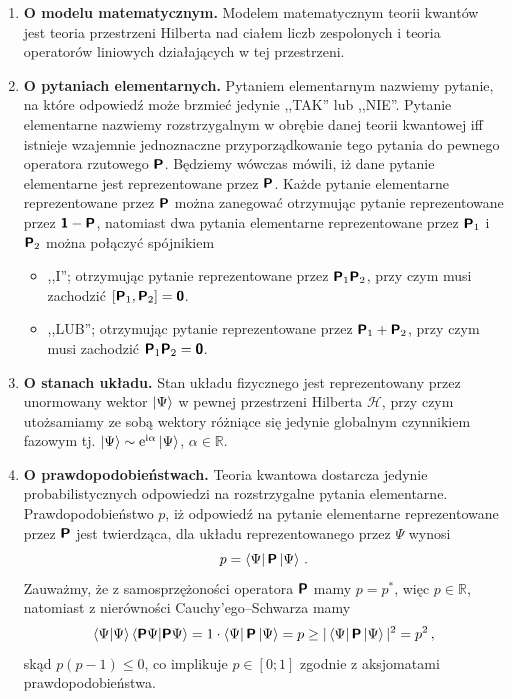 \documentclass{myclass}
\begin{document}
\begin{enumerate}[label=\Roman*.]
    
    \item \textbf{O modelu matematycznym.} Modelem matematycznym teorii kwantów jest teoria
    przestrzeni Hilberta nad ciałem liczb zespolonych i teoria operatorów liniowych działających w
    tej przestrzeni.

    \item \textbf{O pytaniach elementarnych.} Pytaniem elementarnym nazwiemy pytanie, na które
    odpowiedź może brzmieć jedynie ,,TAK'' lub ,,NIE''. Pytanie elementarne nazwiemy rozstrzygalnym
    w obrębie danej teorii kwantowej iff istnieje wzajemnie jednoznaczne przyporządkowanie tego
    pytania do pewnego operatora rzutowego \(\boldsymbol{\mathsf{P}}\). Będziemy wówczas mówili, iż dane pytanie
    elementarne jest reprezentowane przez \(\boldsymbol{\mathsf{P}}\). Każde pytanie elementarne reprezentowane
    przez \(\boldsymbol{\mathsf{P}}\) można zanegować otrzymując pytanie reprezentowane przez \(\boldsymbol{\mathsf{1}} -
    \boldsymbol{\mathsf{P}}\), natomiast dwa pytania elementarne reprezentowane przez \(\boldsymbol{\mathsf{P}}_1\) i
    \(\boldsymbol{\mathsf{P}}_2\) można połączyć spójnikiem
    \begin{itemize}
        \item ,,I''; otrzymując pytanie reprezentowane przez \(\boldsymbol{\mathsf{P}}_1\boldsymbol{\mathsf{P}}_2\), przy czym
        musi zachodzić \([\boldsymbol{\mathsf{P}}_1, \boldsymbol{\mathsf{P}}_2] = \boldsymbol{\mathsf{\mathsf{0}}}\).

        \item ,,LUB''; otrzymując pytanie reprezentowane przez \(\boldsymbol{\mathsf{P}}_1 + \boldsymbol{\mathsf{P}}_2\), przy
        czym musi zachodzić \(\boldsymbol{\mathsf{P}}_1\boldsymbol{\mathsf{P}}_2 = \boldsymbol{\mathsf{\mathsf{0}}}\).

    \end{itemize}

    \item \textbf{O stanach układu.} Stan układu fizycznego jest reprezentowany przez unormowany
    wektor \(\ket{\Psi}\) w pewnej przestrzeni Hilberta \(\mathscr{H}\), przy czym utożsamiamy ze
    sobą wektory różniące się jedynie globalnym czynnikiem fazowym tj. \(\ket{\Psi} \sim
    \mathrm{e}^{\mathrm{i}\alpha}\ket{\Psi}\), \(\alpha \in \mathbb{R}\).

    \item \textbf{O prawdopodobieństwach.} Teoria kwantowa dostarcza jedynie probabilistycznych
    odpowiedzi na rozstrzygalne pytania elementarne. Prawdopodobieństwo \(p\), iż odpowiedź na
    pytanie elementarne reprezentowane przez \(\boldsymbol{\mathsf{P}}\) jest twierdząca, dla układu
    reprezentowanego przez \(\Psi\) wynosi
    \begin{equation*}
        p = \bra{\Psi}\boldsymbol{\mathsf{P}}\ket{\Psi}\,.
    \end{equation*}
    Zauważmy, że z samosprzężoności operatora \(\boldsymbol{\mathsf{P}}\) mamy \(p = p^*\), więc \(p
    \in\mathbb{R}\), natomiast z nierówności Cauchy'ego--Schwarza mamy
    \begin{equation*}
        \braket{\Psi}\braket{\boldsymbol{\mathsf{P}}\Psi} = 1 \cdot \bra{\Psi}\boldsymbol{\mathsf{P}}\ket{\Psi} = p \geq |\bra{\Psi}\boldsymbol{\mathsf{P}}\ket{\Psi}|^2 = p^2\,,
    \end{equation*}
    skąd \(p(p-1) \leq 0\), co implikuje \(p \in [0;1]\) zgodnie z aksjomatami prawdopodobieństwa.


\end{enumerate}
\end{document}
